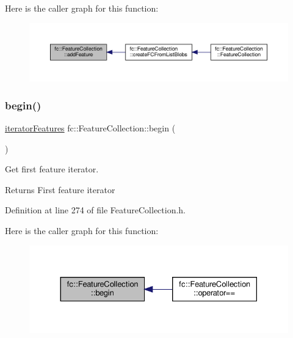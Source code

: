Here is the caller graph for this function\+:
\nopagebreak
\begin{figure}[H]
\begin{center}
\leavevmode
\includegraphics[width=350pt]{d9/d78/classfc_1_1FeatureCollection_a4c55b86ac61d97aa9ca21ff64e16061b_icgraph}
\end{center}
\end{figure}
\mbox{\label{classfc_1_1FeatureCollection_acec3cae7f29d3970921b78a95c199ef3}} 
\subsubsection{\texorpdfstring{begin()}{begin()}}
{\footnotesize\ttfamily \hyperlink{classfc_1_1FeatureCollection_a947efbbe893a14c47d2d5e535a0e9429}{iterator\+Features} fc\+::\+Feature\+Collection\+::begin (\begin{DoxyParamCaption}{ }\end{DoxyParamCaption})\hspace{0.3cm}{\ttfamily [inline]}}



Get first feature iterator. 

\begin{DoxyReturn}{Returns}
First feature iterator 
\end{DoxyReturn}


Definition at line 274 of file Feature\+Collection.\+h.

Here is the caller graph for this function\+:
\nopagebreak
\begin{figure}[H]
\begin{center}
\leavevmode
\includegraphics[width=330pt]{d9/d78/classfc_1_1FeatureCollection_acec3cae7f29d3970921b78a95c199ef3_icgraph}
\end{center}
\end{figure}
\mbox{\label{classfc_1_1FeatureCollection_a6a3df355558df392bbf54e8734975964}} 
